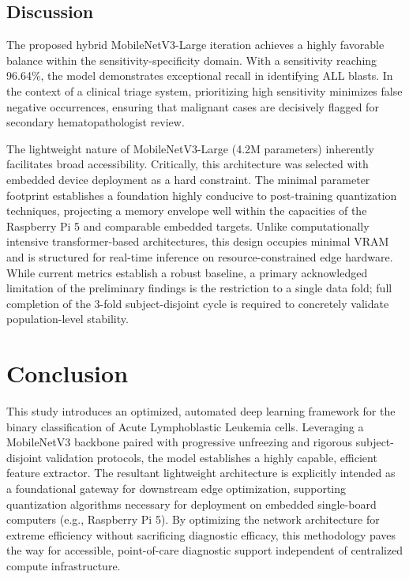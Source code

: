 \documentclass[journal]{IEEEtran}
\begin{document}
    \subsection{Discussion}
    The proposed hybrid MobileNetV3-Large iteration achieves a highly favorable balance within the sensitivity-specificity domain. With a sensitivity reaching 96.64\%, the model demonstrates exceptional recall in identifying ALL blasts. In the context of a clinical triage system, prioritizing high sensitivity minimizes false negative occurrences, ensuring that malignant cases are decisively flagged for secondary hematopathologist review. 

    The lightweight nature of MobileNetV3-Large (4.2M parameters) inherently facilitates broad accessibility. Critically, this architecture was selected with embedded device deployment as a hard constraint. The minimal parameter footprint establishes a foundation highly conducive to post-training quantization techniques, projecting a memory envelope well within the capacities of the Raspberry Pi 5 and comparable embedded targets. Unlike computationally intensive transformer-based architectures, this design occupies minimal VRAM and is structured for real-time inference on resource-constrained edge hardware. While current metrics establish a robust baseline, a primary acknowledged limitation of the preliminary findings is the restriction to a single data fold; full completion of the 3-fold subject-disjoint cycle is required to concretely validate population-level stability.

    \section{Conclusion}
    This study introduces an optimized, automated deep learning framework for the binary classification of Acute Lymphoblastic Leukemia cells. Leveraging a MobileNetV3 backbone paired with progressive unfreezing and rigorous subject-disjoint validation protocols, the model establishes a highly capable, efficient feature extractor. The resultant lightweight architecture is explicitly intended as a foundational gateway for downstream edge optimization, supporting quantization algorithms necessary for deployment on embedded single-board computers (e.g., Raspberry Pi 5). By optimizing the network architecture for extreme efficiency without sacrificing diagnostic efficacy, this methodology paves the way for accessible, point-of-care diagnostic support independent of centralized compute infrastructure.
\end{document}
